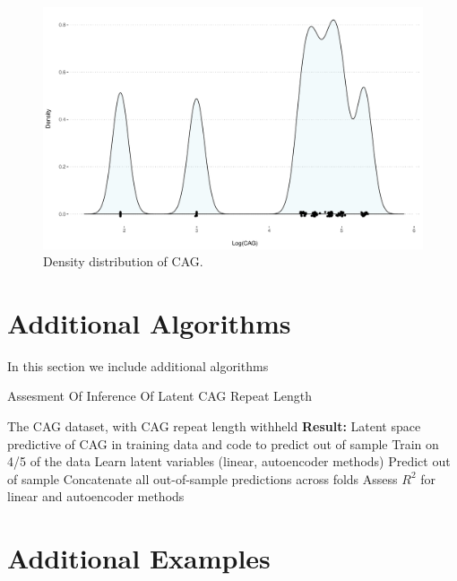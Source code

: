 \documentclass[onecolumn]{article}
\begin{document}
\begin{figure}[ht!]
  \centering
  \includegraphics[width=\linewidth]{./images/cagPlots.pdf}
      \caption{\label{fig_cag_density} Density distribution of CAG. }
\end{figure}

\clearpage
\section{Additional Algorithms}
In this section we include additional algorithms

\begin{algorithm}%
 \caption{Assesment Of Inference Of Latent CAG Repeat Length}
 \label{alg_cag}
\begin{algorithmic}
 The CAG dataset, with CAG repeat length withheld
\STATE \textbf{Result:} Latent space predictive of CAG in training data and code to predict out of sample
  \STATE Train on 4/5 of the data
  \STATE Learn latent variables (linear, autoencoder methods)
  \STATE Predict out of sample
 \ENDFOR
 \STATE Concatenate all out-of-sample predictions across folds
 \STATE Assess $R^{2}$ for linear and autoencoder methods
\end{algorithmic}
\end{algorithm}

\clearpage
\section{Additional Examples}
\small


\end{document}
